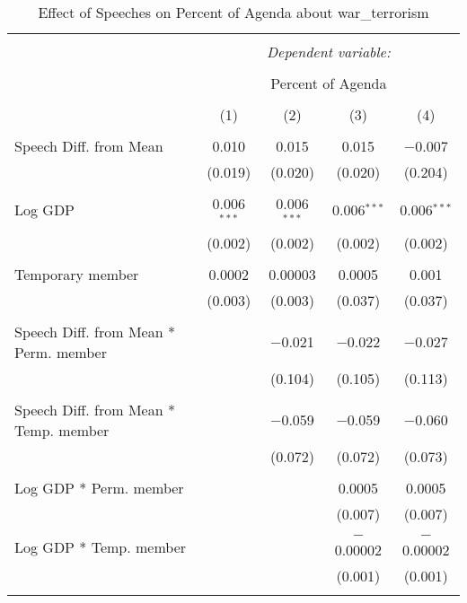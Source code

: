 
\begin{table}[!htbp] \centering 
  \caption{Effect of Speeches on Percent of Agenda about war_terrorism} 
  \label{} 
\begin{tabular}{@{\extracolsep{5pt}}lcccc} 
\\[-1.8ex]\hline 
\hline \\[-1.8ex] 
 & \multicolumn{4}{c}{\textit{Dependent variable:}} \\ 
\cline{2-5} 
\\[-1.8ex] & \multicolumn{4}{c}{Percent of Agenda} \\ 
\\[-1.8ex] & (1) & (2) & (3) & (4)\\ 
\hline \\[-1.8ex] 
 Speech Diff. from Mean & 0.010 & 0.015 & 0.015 & $-$0.007 \\ 
  & (0.019) & (0.020) & (0.020) & (0.204) \\ 
  & & & & \\ 
 Log GDP & 0.006$^{***}$ & 0.006$^{***}$ & 0.006$^{***}$ & 0.006$^{***}$ \\ 
  & (0.002) & (0.002) & (0.002) & (0.002) \\ 
  & & & & \\ 
 Temporary member & 0.0002 & 0.00003 & 0.0005 & 0.001 \\ 
  & (0.003) & (0.003) & (0.037) & (0.037) \\ 
  & & & & \\ 
 Speech Diff. from Mean * Perm. member &  & $-$0.021 & $-$0.022 & $-$0.027 \\ 
  &  & (0.104) & (0.105) & (0.113) \\ 
  & & & & \\ 
 Speech Diff. from Mean * Temp. member &  & $-$0.059 & $-$0.059 & $-$0.060 \\ 
  &  & (0.072) & (0.072) & (0.073) \\ 
  & & & & \\ 
 Log GDP * Perm. member &  &  & 0.0005 & 0.0005 \\ 
  &  &  & (0.007) & (0.007) \\ 
  & & & & \\ 
 Log GDP * Temp. member &  &  & $-$0.00002 & $-$0.00002 \\ 
  &  &  & (0.001) & (0.001) \\ 
  & & & & \\ 

\end{tabular}
\end{table}
